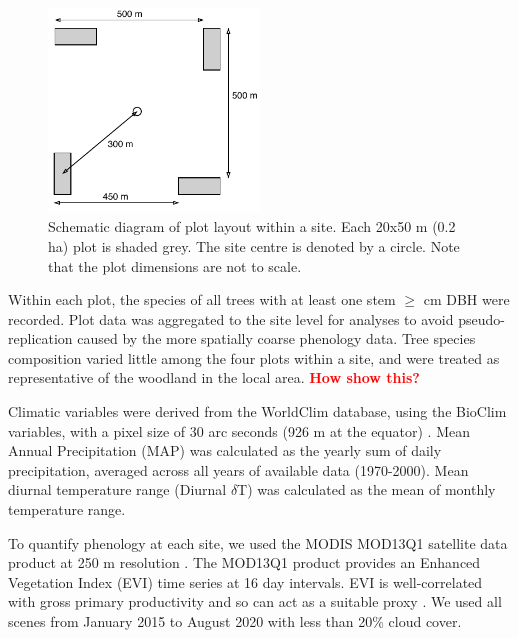 \documentclass[11pt,a4paper]{article}
\newcommand{\todo}[1]{\textcolor{red}{\textbf{#1}}}   %
\begin{document}
\begin{figure}[H]
\centering
	\includegraphics[width=0.5\textwidth]{schematic.drawio}
	\caption{Schematic diagram of plot layout within a site. Each 20x50 m (0.2 ha) plot is shaded grey. The site centre is denoted by a circle. Note that the plot dimensions are not to scale.}
	\label{schematic}
\end{figure}

Within each plot, the species of all trees with at least one stem $\geq$\stemSize{} cm DBH were recorded. Plot data was aggregated to the site level for analyses to avoid pseudo-replication caused by the more spatially coarse phenology data. Tree species composition varied little among the four plots within a site, and were treated as representative of the woodland in the local area. \todo{How show this?}

Climatic variables were derived from the WorldClim database, using the BioClim variables, with a pixel size of 30 arc seconds (926 m at the equator) \citep{Fick2017}. Mean Annual Precipitation (MAP) was calculated as the yearly sum of daily precipitation, averaged across all years of available data (1970-2000). Mean diurnal temperature range (Diurnal $\delta$T) was calculated as the mean of monthly temperature range. 

To quantify phenology at each site, we used the MODIS MOD13Q1 satellite data product at 250 m resolution \citep{}. The MOD13Q1 product provides an Enhanced Vegetation Index (EVI) time series at 16 day intervals. EVI is well-correlated with gross primary productivity and so can act as a suitable proxy \citep{}. We used all scenes from January 2015 to August 2020 with less than 20\% cloud cover.
\end{document}
